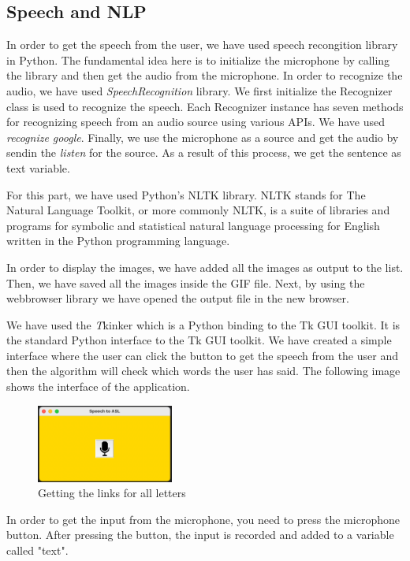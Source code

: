 \documentclass[twocolumn,10pt]{asme2ej}
\begin{document}
\subsection{Speech and NLP}
In order to get the speech from the user, we have used speech recongition library in Python. The fundamental idea here is to initialize the microphone by calling the library and then get the audio from the microphone. In order to recognize the audio, we have used \textit{SpeechRecognition} library. We first initialize the Recognizer class is used to recognize the speech. Each Recognizer instance has seven methods for recognizing speech from an audio source using various APIs. We have used \textit{recognize google}. Finally, we use the microphone as a source and get the audio by sendin the \textit{listen} for the source. As a result of this process, we get the sentence as text variable. 

For this part, we have used Python's NLTK library. NLTK stands for The Natural Language Toolkit, or more commonly NLTK, is a suite of libraries and programs for symbolic and statistical natural language processing for English written in the Python programming language. 

In order to display the images, we have added all the images as output to the list. Then, we have saved all the images inside the GIF file. Next, by using the webbrowser library we have opened the output file in the new browser. 

We have used the {\emph Tkinker} which is a Python binding to the Tk GUI toolkit. It is the standard Python interface to the Tk GUI toolkit. We have created a simple interface where the user can click the button to get the speech from the user and then the algorithm will check which words the user has said. The following image shows the interface of the application.

\begin{figure}[h]
    \centering
    \includegraphics[width=0.4\textwidth]{figure/fig2.png}
    \caption{Getting the links for all letters}
    \label{fig:mesh1}
\end{figure}

In order to get the input from the microphone, you need to press the microphone button. After pressing the button, the input is recorded and added to a variable called "text". 
\end{document}
